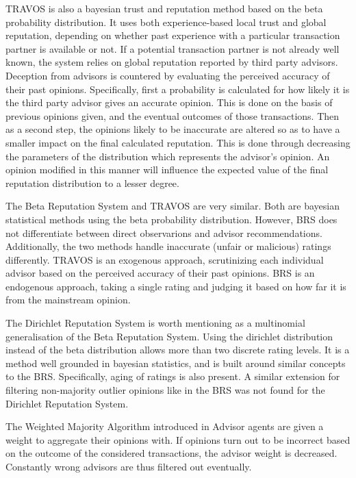 \documentclass[%
    ]{\PathToTumTemplate/thesis/tum_thesis}
\begin{document}
TRAVOS is also a bayesian trust and reputation method based on the beta probability distribution\cite{teacy_travos_2006}.
It uses both experience-based local trust and global reputation, depending on whether past experience with a particular transaction partner is available or not.
If a potential transaction partner is not already well known, the system relies on global reputation reported by third party advisors.
Deception from advisors is countered by evaluating the perceived accuracy of their past opinions.
Specifically, first a probability is calculated for how likely it is the third party advisor gives an accurate opinion.
This is done on the basis of previous opinions given, and the eventual outcomes of those transactions.
Then as a second step, the opinions likely to be inaccurate are altered so as to have a smaller impact on the final calculated reputation.
This is done through decreasing the parameters of the distribution which represents the advisor's opinion. An opinion modified in this manner will influence the expected value of the final reputation distribution to a lesser degree.

The Beta Reputation System and TRAVOS are very similar.
Both are bayesian statistical methods using the beta probability distribution.
However, BRS does not differentiate between direct observarions and advisor recommendations.
Additionally, the two methods handle inaccurate (unfair or malicious) ratings differently.
TRAVOS is an exogenous approach, scrutinizing each individual advisor based on the perceived accuracy of their past opinions.
BRS is an endogenous approach, taking a single rating and judging it based on how far it is from the mainstream opinion.


The Dirichlet Reputation System is worth mentioning as a multinomial generalisation of the Beta Reputation System\cite{josang_dirichlet_2007}.
Using the dirichlet distribution instead of the beta distribution allows more than two discrete rating levels.
It is a method well grounded in bayesian statistics, and is built around similar concepts to the BRS.
Specifically, aging of ratings is also present.
A similar extension for filtering non-majority outlier opinions like in the BRS was not found for the Dirichlet Reputation System.

The Weighted Majority Algorithm introduced in \cite{yu_detecting_2003}  
Advisor agents are given a weight to aggregate their opinions with.
If opinions turn out to be incorrect based on the outcome of the considered transactions, the advisor weight is decreased.
Constantly wrong advisors are thus filtered out eventually.
\end{document}

